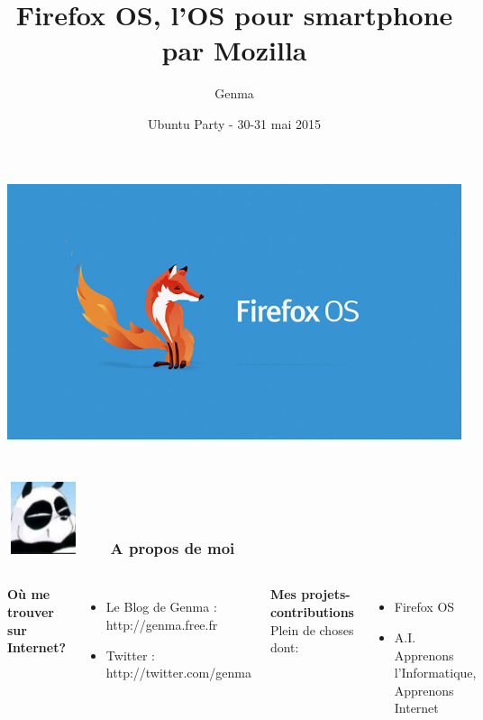\documentclass{beamer}
\title[Firefox OS, l'OS pour smartphone par Mozilla]{Firefox OS, l'OS pour smartphone par Mozilla}
\date{Ubuntu Party - 30-31 mai 2015}
\author{Genma}
\begin{document}
\begin{frame}
	\titlepage
	\begin{center}		
	\includegraphics[scale=0.2]{./images/firefox-os.jpg}
		\\	
	\\[2.5ex]
		{\tiny\CcNote{\CcLongnameByNcSa}}
		\vspace*{-2.5ex}
	\end{center}
\end{frame}

\begin{frame}
\frametitle{\includegraphics[scale=0.4]{./images/Genma.jpg} \ \ \  A propos de moi  }
\begin{columns}[c] 
\textbf{Où me trouver sur Internet?}
\begin{itemize}
\item Le Blog de Genma : http://genma.free.fr
\item Twitter : http://twitter.com/genma
\end{itemize}
\textbf{Mes projets-contributions}
\\ Plein de choses dont:
\begin{itemize}
\item Firefox OS
\item A.I. Apprenons l'Informatique, Apprenons Internet
\end{itemize}

\includegraphics[width=5cm,height=5cm]{./images/blog.png} 
\end{columns}
\end{frame}
\end{document}

